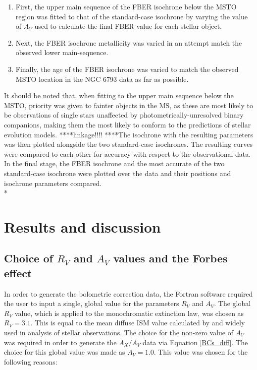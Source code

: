 \documentclass[12pt, a4paper]{report}
\begin{document}
\begin{enumerate}
\item First, the upper main sequence of the FBER isochrone below the MSTO region was fitted to that of the standard-case isochrone by varying the value of $A_{V}$ used to calculate the final FBER value for each stellar object.
\item Next, the FBER isochrone metallicity was varied in an attempt match the observed lower main-sequence.
\item Finally, the age of the FBER isochrone was varied to match the observed MSTO location in the NGC 6793 data as far as possible.
\end{enumerate}

It should be noted that, when fitting  to the upper main sequence below the MSTO, priority was given to fainter objects in the MS, as these are most likely to be observations of single stars unaffected by photometrically-unresolved binary companions, making them the most likely to conform to the predictions of stellar evolution models.
****linkage!!!!
****The isochrone with the resulting parameters was then plotted alongside the two standard-case isochrones. The resulting curves were compared to each other for accuracy with respect to the observational data. In the final stage, the FBER isochrone and the most accurate of the two standard-case isochrone were plotted over the data and their positions and isochrone parameters compared.\\* 



\chapter{Results and discussion}
\section{Choice of $R_{V}$ and $A_{V}$ values and the Forbes effect} \label{forbes}
In order to generate the bolometric correction data, the Fortran software required the user to input a single, global value for the parameters $R_{V}$ and $A_{V}$. The global $R_{V}$ value, which is applied to the \cite{1989ApJ...345..245C} monochromatic extinction law, was chosen as $R_{V} = 3.1$. This is equal to the mean diffuse ISM value calculated by \cite{1985ApJ...288..618R} and widely used in analysis of stellar observations. The choice for the non-zero value of $A_{V}$ was required in order to generate the $A_{X}/A_{V}$ data via Equation \ref{BCs_diff}. The choice for this global value was made as $A_{V} = 1.0$. This value was chosen for the following reasons:
\end{document}
